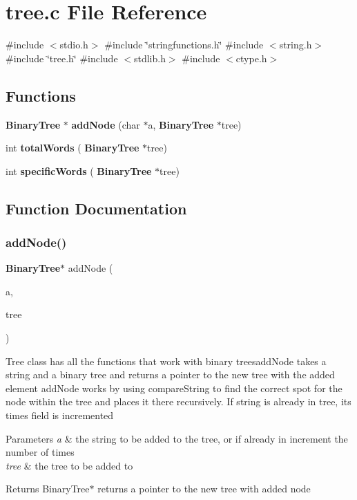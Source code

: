 \section{tree.\+c File Reference}
\label{tree_8c}
{\ttfamily \#include $<$stdio.\+h$>$}\newline
{\ttfamily \#include \char`\"{}stringfunctions.\+h\char`\"{}}\newline
{\ttfamily \#include $<$string.\+h$>$}\newline
{\ttfamily \#include \char`\"{}tree.\+h\char`\"{}}\newline
{\ttfamily \#include $<$stdlib.\+h$>$}\newline
{\ttfamily \#include $<$ctype.\+h$>$}\newline
\subsection*{Functions}
\begin{DoxyCompactItemize}
\item 
\textbf{ Binary\+Tree} $\ast$ \textbf{ add\+Node} (char $\ast$a, \textbf{ Binary\+Tree} $\ast$tree)
\item 
int \textbf{ total\+Words} (\textbf{ Binary\+Tree} $\ast$tree)
\item 
int \textbf{ specific\+Words} (\textbf{ Binary\+Tree} $\ast$tree)
\end{DoxyCompactItemize}


\subsection{Function Documentation}
\mbox{\label{tree_8c_a4bd69b66d4a265ef2aa739944c317c37}} 
\subsubsection{add\+Node()}
{\footnotesize\ttfamily \textbf{ Binary\+Tree}$\ast$ add\+Node (\begin{DoxyParamCaption}\item[{char $\ast$}]{a,  }\item[{\textbf{ Binary\+Tree} $\ast$}]{tree }\end{DoxyParamCaption})}

Tree class has all the functions that work with binary treesadd\+Node takes a string and a binary tree and returns a pointer to the new tree with the added element add\+Node works by using compare\+String to find the correct spot for the node within the tree and places it there recursively. If string is already in tree, its times field is incremented 
\begin{DoxyParams}{Parameters}
{\em a} & the string to be added to the tree, or if already in increment the number of times \\
\hline
{\em tree} & the tree to be added to \\
\hline
\end{DoxyParams}
\begin{DoxyReturn}{Returns}
Binary\+Tree$\ast$ returns a pointer to the new tree with added node 
\end{DoxyReturn}


